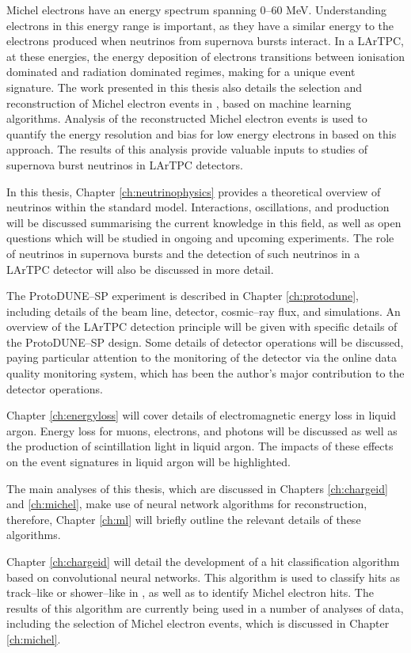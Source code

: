 Michel electrons have an energy spectrum spanning 0--60 MeV. Understanding
electrons in this energy range is important, as they have a similar energy to 
the electrons produced when neutrinos from supernova bursts interact. In a 
LArTPC, at these energies, the energy deposition of electrons transitions 
between ionisation dominated and radiation dominated regimes, making for a 
unique event signature. The work presented in this thesis also details the 
selection and reconstruction of Michel electron events in \protodune{}, based 
on machine learning algorithms. Analysis of the reconstructed Michel electron 
events is used to quantify the energy resolution and bias for low energy 
electrons in \protodune{} based on this approach. The results of this analysis 
provide valuable inputs to studies of supernova burst neutrinos in LArTPC 
detectors.

In this thesis, Chapter \ref{ch:neutrinophysics} provides a theoretical 
overview of neutrinos within the standard model. Interactions, oscillations, 
and production will be discussed summarising the current knowledge in this
field, as well as open questions which will be studied in ongoing and upcoming 
experiments. The role of neutrinos in supernova bursts and the detection of 
such neutrinos in a LArTPC detector will also be discussed in more detail.

The ProtoDUNE--SP experiment is described in Chapter \ref{ch:protodune},
including details of the beam line, detector, cosmic--ray flux, and simulations.
An overview of the LArTPC detection principle will be given with specific
details of the ProtoDUNE--SP design. Some details of detector operations will be
discussed, paying particular attention to the monitoring of the detector via the
online data quality monitoring system, which has been the author's major 
contribution to the detector operations.

Chapter \ref{ch:energyloss} will cover details of electromagnetic energy loss
in liquid argon. Energy loss for muons, electrons, and photons will be discussed
as well as the production of scintillation light in liquid argon. The impacts 
of these effects on the event signatures in liquid argon will be highlighted.

The main analyses of this thesis, which are discussed in Chapters 
\ref{ch:chargeid} and \ref{ch:michel}, make use of neural network algorithms 
for reconstruction, therefore, Chapter \ref{ch:ml} will briefly outline the 
relevant details of these algorithms.

Chapter \ref{ch:chargeid} will detail the development of a hit classification
algorithm based on convolutional neural networks. This algorithm is used to
classify hits as track--like or shower--like in \protodune{}, as well as to 
identify Michel electron hits. The results of this algorithm are currently being
used in a number of analyses of \protodune{} data, including the selection of 
Michel electron events, which is discussed in Chapter \ref{ch:michel}.


